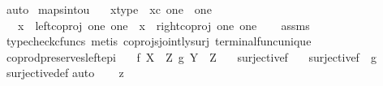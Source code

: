 \begin{isabellebody}
\ auto\isanewline
{}\isamarkupfalse%
%
\endisatagproof
{\isafoldproof}%
%
\isadelimproof
\isanewline
%
\endisadelimproof
\isanewline
{}\isamarkupfalse%
\ maps{\isacharunderscore}{\kern0pt}into{\isacharunderscore}{\kern0pt}{}u{}{\isacharcolon}{\kern0pt}\isanewline
\ \ \ x{\isacharunderscore}{\kern0pt}type{\isacharcolon}{\kern0pt}\ \ {\isachardoublequoteopen}x{\isasymin}\isactrlsub c\ {\isacharparenleft}{\kern0pt}one\ {\isasymCoprod}\ one{\isacharparenright}{\kern0pt}{\isachardoublequoteclose}\isanewline
\ \ \ {\isachardoublequoteopen}{\isacharparenleft}{\kern0pt}x\ {\isacharequal}{\kern0pt}\ left{\isacharunderscore}{\kern0pt}coproj\ one\ one{\isacharparenright}{\kern0pt}\ {\isasymor}\ {\isacharparenleft}{\kern0pt}x\ {\isacharequal}{\kern0pt}\ right{\isacharunderscore}{\kern0pt}coproj\ one\ one{\isacharparenright}{\kern0pt}{\isachardoublequoteclose}\isanewline
%
\isadelimproof
\ \ %
\endisadelimproof
%
\isatagproof
{}\isamarkupfalse%
\ assms\ \isamarkupfalse%
\ {\isacharparenleft}{\kern0pt}typecheck{\isacharunderscore}{\kern0pt}cfuncs{\isacharcomma}{\kern0pt}\ metis\ coprojs{\isacharunderscore}{\kern0pt}jointly{\isacharunderscore}{\kern0pt}surj\ terminal{\isacharunderscore}{\kern0pt}func{\isacharunderscore}{\kern0pt}unique{\isacharparenright}{\kern0pt}%
\endisatagproof
{\isafoldproof}%
%
\isadelimproof
\isanewline
%
\endisadelimproof
\isanewline
{}\isamarkupfalse%
\ coprod{\isacharunderscore}{\kern0pt}preserves{\isacharunderscore}{\kern0pt}left{\isacharunderscore}{\kern0pt}epi{\isacharcolon}{\kern0pt}\isanewline
\ \ \ {\isachardoublequoteopen}f{\isacharcolon}{\kern0pt}\ X\ {\isasymrightarrow}\ Z{\isachardoublequoteclose}\ {\isachardoublequoteopen}g{\isacharcolon}{\kern0pt}\ Y\ {\isasymrightarrow}\ Z{\isachardoublequoteclose}\isanewline
\ \ \ {\isachardoublequoteopen}surjective{\isacharparenleft}{\kern0pt}f{\isacharparenright}{\kern0pt}{\isachardoublequoteclose}\isanewline
\ \ \ {\isachardoublequoteopen}surjective{\isacharparenleft}{\kern0pt}f\ {\isasymamalg}\ g{\isacharparenright}{\kern0pt}{\isachardoublequoteclose}\isanewline
%
\isadelimproof
\ \ %
\endisadelimproof
%
\isatagproof
{}\isamarkupfalse%
\ surjective{\isacharunderscore}{\kern0pt}def\isanewline
{}\isamarkupfalse%
{\isacharparenleft}{\kern0pt}auto{\isacharparenright}{\kern0pt}\isanewline
\ \ \isamarkupfalse%
\ z\isanewline
\ \ \isamarkupfalse%

\end{isabellebody}
